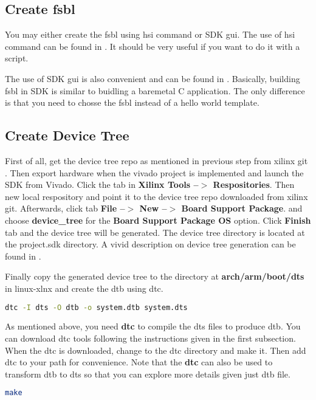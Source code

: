 \documentclass[12pt]{article} %
\begin{document}
\subsection{Create fsbl} 
You may either create the fsbl using hsi command or SDK gui.
The use of hsi command can be found in \cite{fsbl-hsi}. It should be very useful 
if you want to do it with a script.

The use of SDK gui is also convenient and can be found in \cite{fsbl-sdk}. 
Basically, building fsbl in SDK is similar to buidling a baremetal 
C application. The only difference is that you need to chosse the fsbl 
instead of a hello world template.

\subsection {Create Device Tree}
First of all, get the device tree repo as mentioned in previous step from xilinx git \cite{xilinx-dts}. 
Then export hardware when the vivado project is implemented and launch the SDK from Vivado.
Click the tab in \textbf{Xilinx Tools --$>$ Respositories}. Then new local respository and point it to the device 
tree repo downloaded from xilinx git. Afterwards, click tab \textbf{File --$>$ New --$>$ Board Support Package}.
and choose \textbf{device\_tree} for the \textbf{Board Support Package OS} option. Click \textbf{Finish} tab and 
the device tree will be generated. The device tree directory is located at the project.sdk directory.
A vivid description on device tree generation can be found in \cite{create-dts}. 

Finally copy the generated device tree to the directory at \textbf{arch/arm/boot/dts} in linux-xlnx 
and create the dtb using dtc.

\begin{lstlisting}[language=bash]
    dtc -I dts -O dtb -o system.dtb system.dts
\end{lstlisting}

As mentioned above, you need \textbf{dtc} to compile the dts files to produce dtb. 
You can download dtc tools following the instructions given in the first subsection.
When the dtc is downloaded, change to the dtc directory and make it. 
Then add dtc to your path for convenience.
Note that the \textbf{dtc} can also be used to transform dtb to dts so that you can explore 
more details given just dtb file.

\begin{lstlisting}[language=bash]
    make
\end{lstlisting}
\end{document}
